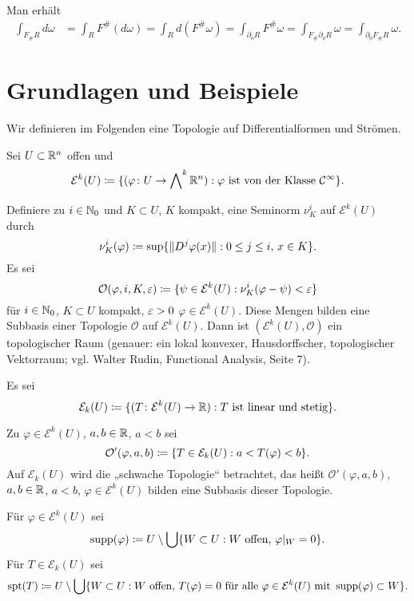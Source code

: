 \documentclass[a4paper,twoside,DIV15,BCOR12mm]{scrbook}
\newcommand{\bw}{\bigwedge\nolimits}
\DeclareMathOperator{\spt}{spt}
\begin{document}
\begin{beweis}
Man erhält
\begin{align*}
\int_{F_\# R} d\omega &= \int_R F^\#(d\omega) 
= \int_R d (F^\#\omega)
= \int_{\partial_oR} F^\# \omega 
= \int_{F_\#\partial_oR} \omega 
= \int_{\partial_0 F_\#R} \omega.
\end{align*}
\end{beweis}

\section{Grundlagen und Beispiele}

Wir definieren im Folgenden eine Topologie auf Differentialformen und Strömen.

Sei $U\subset \mathbb{R}^n$ offen und
\[
\mathcal E^k(U)\da \{ (\varphi\colon U\to \bw^k\MdR^n) : \varphi \text{ ist von der Klasse }\mathcal C^\infty\}.
\]

Definiere zu $i\in\mathbb{N}_0$ und $K\subset U$, $K$ kompakt, eine Seminorm $\nu_K^i$ auf $\mathcal E^k(U)$ durch
\[
\nu^i_K(\varphi) \da \sup \{\|D^j\varphi(x)\| : 0 \le j \le i,\, x\in K\}.
\]
Es sei
\[
\mathcal O(\varphi, i, K,\ep) \da \{\psi \in \mathcal E^k(U) : \nu_K^i(\varphi-\psi) < \ep\}
\]
für $i\in\mathbb{N}_0$, $K\subset U$ kompakt, $\varepsilon>0$ $\varphi \in \mathcal E^k(U)$. Diese Mengen bilden eine Subbasis einer Topologie $\mathcal O$ auf $\mathcal E^k(U)$. Dann ist $(\mathcal E^k(U),\mathcal O)$ ein topologischer Raum (genauer: ein lokal konvexer, Hausdorffscher, topologischer Vektorraum; vgl. Walter Rudin, Functional Analysis, Seite 7).

\begin{definition}
Es sei
\[
\mathcal E_k(U) \da \{( T\colon \mathcal E^k(U) \to \MdR) : T\text{ ist linear und stetig}\}.
\]
\end{definition}

Zu $\varphi \in \mathcal E^k(U)$, $a,b\in \mathbb{R}$, $a<b$ sei
\[
\mathcal O'(\varphi,a,b) \da \{ T\in \mathcal E_k(U) : a < T(\varphi) < b\}.
\]
Auf $\mathcal E_k(U)$ wird die „schwache Topologie“ betrachtet, das heißt $\mathcal O'(\varphi,a,b)$, $a,b\in \mathbb{R}$, $a<b$, $\varphi \in \mathcal E^k(U)$ bilden eine Subbasis dieser Topologie.

\begin{definition}[Träger]
Für $\varphi \in \mathcal E^k(U)$ sei
\[
\supp(\varphi) \da U \setminus \bigcup \{ W\subset U: \text{$W$ offen, } \varphi|_W = 0\}.
\]
Für $T\in \mathcal E_k(U)$ sei
\[
\spt(T) \da U \setminus \bigcup \{ W\subset U: \text{$W$ offen, } T(\varphi)=0 \text{ für alle }\varphi \in \mathcal E^k(U) \text{ mit } \supp(\varphi)\subset W\}.
\]
\end{definition}
\end{document}
